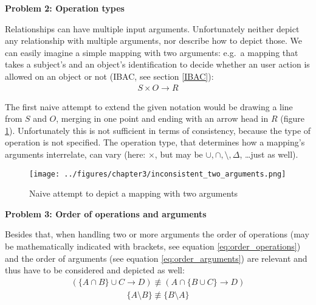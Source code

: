 \documentclass[twoside, openright, 12pt]{book}
\begin{document}
\vspace{4mm}
\noindent
\textbf{Problem 2: Operation types}
\vspace{1mm}

\noindent
Relationships can have multiple input arguments.
Unfortunately \cite{Amthor18} neither depict any relationship with multiple arguments, nor describe how to depict those.
We can easily imagine a simple mapping with two arguments: e.g.~a mapping that takes a subject's and an object's identification to decide whether an user action is allowed on an object or not (IBAC, see section \ref{IBAC}):
\begin{align}
S \times O \rightarrow R 
\end{align}

\noindent
The first naive attempt to extend the given notation would be drawing a line from $S$ and $O$, merging in one point and ending with an arrow head in $R$ (figure \ref{fig:inconsistent_two_arguments}).
Unfortunately this is not sufficient in terms of consistency, because the type of operation is not specified.
The operation type, that determines how a mapping's arguments interrelate, can vary (here: $\times$, but may be $\cup, \cap, \setminus, \Delta$, \dots just as well).

\begin{figure}[htb]
	\centering
	\texttt{[image: ../figures/chapter3/inconsistent\_two\_arguments.png]}
	\caption{Naive attempt to depict a mapping with two arguments}
	\label{fig:inconsistent_two_arguments}
\end{figure}

\vspace{4mm}
\noindent
\textbf{Problem 3: Order of operations and arguments}
\vspace{1mm}

\noindent
Besides that, when handling two or more arguments the order of operations (may be mathematically indicated with brackets, see equation \ref{eq:order_operations}) and the order of arguments (see equation \ref{eq:order_arguments}) are relevant and thus have to be considered and depicted as well:
\begin{equation}
\begin{gathered}
(\lbrace A \cap B \rbrace \cup C \rightarrow D) \not\equiv
(A \cap \lbrace B \cup C \rbrace \rightarrow D)
\end{gathered}\label{eq:order_operations}
\end{equation}
\vspace{-8mm}
\begin{equation}
\begin{gathered}
\lbrace A \setminus B \rbrace \not\equiv \lbrace B \setminus A \rbrace 
\end{gathered}\label{eq:order_arguments}
\end{equation}
\end{document}
